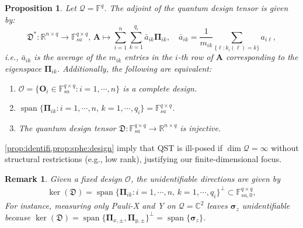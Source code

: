 \documentclass[noinfoline]{imsart}\setcounter{tocdepth}{2}
\renewcommand{\b}[1]{\mathbb{#1}} %
\newcommand{\m}[1]{\mathbf{#1}} %
\newcommand{\s}[1]{\mathscr{#1}} %
\newcommand{\f}[1]{\mathfrak{#1}} %
\renewcommand{\c}[1]{\mathcal{#1}} %
\newcommand{\mb}[1]{\boldsymbol{#1}} %
\DeclareMathOperator*{\spann}{span}
\theoremstyle{plain}
\newtheorem{proposition}[theorem]{Proposition}
\newtheorem{remark}[theorem]{Remark}
\begin{document}
\begin{proposition}\label{prop:sphe:design}
Let $\c{Q} = \b{F}^{q}$. The adjoint of the quantum design tensor is given by:
\begin{equation*}
    \f{D}^{*}: \b{R}^{n \times q} \to \b{F}_{sa}^{q \times q}, \, \m{A} \mapsto \sum_{i=1}^{n} \sum_{k=1}^{q_{i}} \bar{a}_{ik} \m{\Pi}_{ik}, \quad \bar{a}_{ik} = \frac{1}{m_{ik}} \sum_{\{\ell : k_{i}(\ell) = k\}} a_{i\ell}, 
\end{equation*}
i.e., $\bar{a}_{ik}$ is the average of the $m_{ik}$ entries in the $i$-th row of $\m{A}$ corresponding to the eigenspace $\m{\Pi}_{ik}$. Additionally, the following are equivalent:
\begin{enumerate}
\item $\s{O} = \{\m{O}_{i} \in \b{F}_{sa}^{q \times q}: i = 1, \cdots, n\}$ is a complete design.
\item $\spann \{\m{\Pi}_{ik} : i = 1, \cdots, n, \, k = 1, \cdots, q_{i} \} = \b{F}_{sa}^{q \times q}$.
\item The quantum design tensor $\f{D}: \b{F}_{sa}^{q \times q} \to \b{R}^{n \times q}$ is injective.
\end{enumerate}
\end{proposition}


\cref{prop:identifi,prop:sphe:design} imply that QST is ill-posed if $\dim \c{Q} = \infty$ without structural restrictions (e.g., low rank), justifying our finite-dimensional focus. 

\begin{remark}
Given a fixed design $\s{O}$, the unidentifiable directions are given by
\begin{align}\label{eq:null:mat}
    \ker(\f{D}) = \spann \{\m{\Pi}_{ik} : i = 1, \cdots, n, \, k = 1, \cdots, q_{i} \}^{\perp}  \subset \b{F}_{sa, 0}^{q \times q},
\end{align}
For instance, measuring only Pauli-X and Y on $\c{Q} = \b{C}^{2}$ leaves $\mb{\sigma}_{z}$ unidentifiable because $\ker(\f{D}) = \spann \{\m{\Pi}_{x, \pm}, \m{\Pi}_{y, \pm} \}^{\perp} = \spann \{\mb{\sigma}_{z}\}$.
\end{remark}
\end{document}
